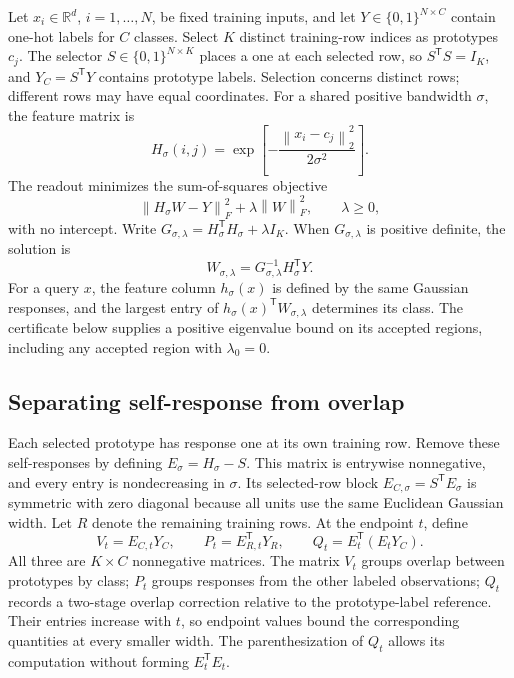\documentclass[preprint,12pt,authoryear]{elsarticle}
\newcommand{\R}{\mathbb{R}}
\newcommand{\norm}[1]{\left\lVert#1\right\rVert}
\newcommand{\tr}{\mathsf{T}}
\begin{document}
Let $x_i\in\R^d$, $i=1,\ldots,N$, be fixed training inputs, and let $Y\in\{0,1\}^{N\times C}$ contain one-hot labels for $C$ classes. Select $K$ distinct training-row indices as prototypes $c_j$. The selector $S\in\{0,1\}^{N\times K}$ places a one at each selected row, so $S^\tr S=I_K$, and $Y_C=S^\tr Y$ contains prototype labels. Selection concerns distinct rows; different rows may have equal coordinates. For a shared positive bandwidth $\sigma$, the feature matrix is
\begin{equation}
 H_\sigma(i,j)=\exp\left[-\frac{\norm{x_i-c_j}_2^2}{2\sigma^2}\right].
 \label{eq:features}
\end{equation}
The readout minimizes the sum-of-squares objective
\begin{equation}
 \norm{H_\sigma W-Y}_F^2+\lambda\norm{W}_F^2,\qquad \lambda\geq0,
 \label{eq:objective}
\end{equation}
with no intercept. Write $G_{\sigma,\lambda}=H_\sigma^\tr H_\sigma+\lambda I_K$. When $G_{\sigma,\lambda}$ is positive definite, the solution is
\begin{equation}
 W_{\sigma,\lambda}=G_{\sigma,\lambda}^{-1}H_\sigma^\tr Y.
 \label{eq:readout}
\end{equation}
For a query $x$, the feature column $h_\sigma(x)$ is defined by the same Gaussian responses, and the largest entry of $h_\sigma(x)^\tr W_{\sigma,\lambda}$ determines its class. The certificate below supplies a positive eigenvalue bound on its accepted regions, including any accepted region with $\lambda_0=0$.

\subsection{Separating self-response from overlap}
Each selected prototype has response one at its own training row. Remove these self-responses by defining $E_\sigma=H_\sigma-S$. This matrix is entrywise nonnegative, and every entry is nondecreasing in $\sigma$. Its selected-row block $E_{C,\sigma}=S^\tr E_\sigma$ is symmetric with zero diagonal because all units use the same Euclidean Gaussian width. Let $R$ denote the remaining training rows. At the endpoint $t$, define
\begin{equation}
 V_t=E_{C,t}Y_C,\qquad
 P_t=E_{R,t}^\tr Y_R,\qquad
 Q_t=E_t^\tr(E_tY_C).
 \label{eq:terms}
\end{equation}
All three are $K\times C$ nonnegative matrices. The matrix $V_t$ groups overlap between prototypes by class; $P_t$ groups responses from the other labeled observations; $Q_t$ records a two-stage overlap correction relative to the prototype-label reference. Their entries increase with $t$, so endpoint values bound the corresponding quantities at every smaller width. The parenthesization of $Q_t$ allows its computation without forming $E_t^\tr E_t$.
\end{document}

